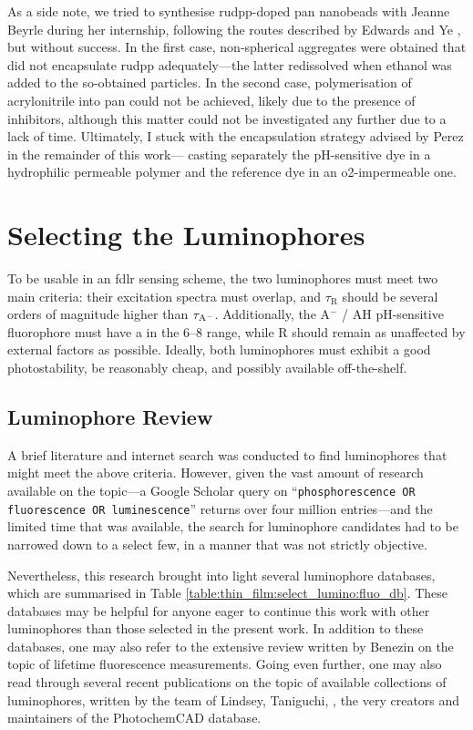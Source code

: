 As a side note, we tried to synthesise \gls{rudpp}-doped \gls{pan} nanobeads with Jeanne Beyrle during her internship, following the routes described by Edwards\cite[Chap.~2]{edwards2011_phd} and Ye \etal{}\cite{ye2012}, but without success. In the first case, non-spherical aggregates were obtained that did not encapsulate \gls{rudpp} adequately---the latter redissolved when ethanol was added to the so-obtained particles. In the second case, polymerisation of acrylonitrile into \gls{pan} could not be achieved, likely due to the presence of inhibitors, although this matter could not be investigated any further due to a lack of time. Ultimately, I stuck with the encapsulation strategy advised by Perez \etal{} in the remainder of this work---\ie{} casting separately the pH-sensitive dye in a hydrophilic permeable polymer and the reference dye in an \gls{o2}-impermeable one.

\section{Selecting the Luminophores}\label{sect:thin_film:select_lumino}

To be usable in an \gls{fdlr} sensing scheme, the two luminophores must meet two main criteria: their excitation spectra must overlap, and $\tau_\mathrm{R}$ should be several orders of magnitude higher than $\tau_\mathrm{A^{\smash{-}}}$. Additionally, the A$^-$ / AH pH-sensitive fluorophore must have a \pKa{} in the 6--8 range, while R should remain as unaffected by external factors as possible. Ideally, both luminophores must exhibit a good photostability, be reasonably cheap, and possibly available off-the-shelf.

\subsection{Luminophore Review}

A brief literature and internet search was conducted to find luminophores that might meet the above criteria. However, given the vast amount of research available on the topic---a Google Scholar query on \enquote{\texttt{phosphorescence OR fluorescence OR luminescence}} returns over four million entries---and the limited time that was available, the search for luminophore candidates had to be narrowed down to a select few, in a manner that was not strictly objective.

Nevertheless, this research brought into light several luminophore databases, which are summarised in Table \ref{table:thin_film:select_lumino:fluo_db}. These databases may be helpful for anyone eager to continue this work with other luminophores than those selected in the present work. In addition to these databases, one may also refer to the extensive review written by Benezin \etal{}\cite{berezin2010} on the topic of lifetime fluorescence measurements. Going even further, one may also read through several recent publications on the topic of available collections of luminophores, written by the team of Lindsey, Taniguchi, \etal{}\cite{taniguchi2018a, taniguchi2018b}, the very creators and maintainers of the PhotochemCAD database.


